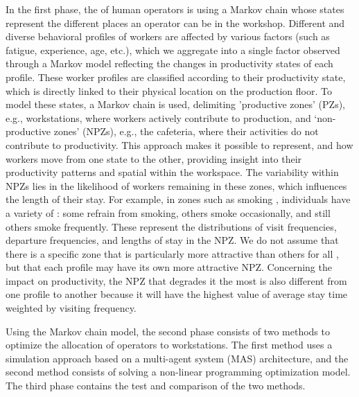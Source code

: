 \documentclass[review,12pt, 3p, times]{elsarticle}
\begin{document}
In the first phase, the  of human operators is  using a Markov chain whose states represent the different places an operator can be in the workshop.
Different and diverse behavioral profiles of workers are affected by various factors (such as fatigue, experience,  age, etc.), which we aggregate into a single factor observed through a Markov model reflecting the changes in productivity states of each profile. These worker profiles are classified according to their productivity state, which is directly linked to their physical location on the production floor. To model these states, a Markov chain is used, delimiting 'productive zones' (PZs), e.g., workstations, where workers actively contribute to  production, and `non-productive zones' (NPZs), e.g., the cafeteria, where their activities do not contribute to productivity. This approach makes it possible to represent, and  how workers move from one state to the other, providing insight into their productivity patterns and spatial  within the workspace. The variability within NPZs lies in the likelihood of workers remaining in these zones, which influences the length of their stay. For example, in zones such as smoking , individuals have a variety of : some refrain from smoking, others smoke occasionally, and still others smoke frequently. These  represent the distributions of visit frequencies, departure frequencies, and lengths of stay in the NPZ.
We do not assume that there is a specific zone that is particularly more attractive than others for all , but that each profile may have its own more attractive NPZ.
Concerning the impact on productivity, the NPZ that degrades it the most is also different from one profile to another because it will have the highest value of average stay time weighted by visiting frequency.


Using the Markov chain  model, the second phase consists of two methods to optimize the allocation of operators to workstations.
The first method uses a simulation approach based on a multi-agent system (MAS) architecture, and the second method consists of solving a non-linear programming optimization model.
The third phase contains the test and comparison of the two methods.
	
\end{document}
